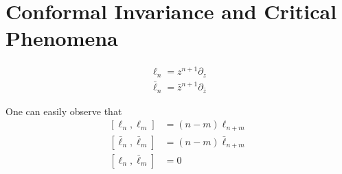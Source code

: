 \chapter{Conformal Invariance and Critical Phenomena}
\label{ch:conf}

\begin{align*}
    \ell_{n}=z^{n+1}\partial_{z} \\
    \bar{\ell}_{n}=\bar{z}^{n+1}\partial_{\bar{z}}
\end{align*}


One can easily observe that
\begin{align}
    \left[\ell_{n},\ell_{m}\right]&=(n-m)\ell_{n+m}\\
    \left[\bar{\ell}_{n},\bar{\ell}_{m}\right]&=(n-m)\bar{\ell}_{n+m}\\
    \left[\ell_{n},\bar{\ell}_{m}\right]&=0
\end{align}

